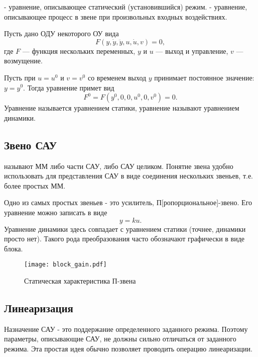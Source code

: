 \documentclass[TAU.tex]{subfiles}
\begin{document}
 - уравнение, описывающее статический (установившийся) режим.
 - уравнение, описывающее процесс в звене при произвольных входных воздействиях.

Пусть дано ОДУ некоторого ОУ вида
\begin{equation}\label{EQ_DYNAMIC}
F(y,\dot y, \ddot y, u, \dot u, v) = 0,
\end{equation}
где $F$ --- функция нескольких переменных, $y$ и $u$ --- выход и управление, $v$ --- возмущение.

Пусть при $u=u^0$ и $v=v^0$ со временем выход $y$ принимает постоянное значение: $y=y^0$. Тогда уравнение  примет вид
\begin{equation}\label{EQ_STATIC}
F^0=F(y^0, 0, 0, u^0, 0, v^0) = 0.
\end{equation}
Уравнение  называется уравнением статики, уравнение  называют уравнением динамики.

\subsection{Звено САУ} %

 называют ММ либо части САУ, либо САУ целиком. Понятие звена удобно использовать для представления САУ в виде соединения нескольких звеньев, т.е. более простых ММ.

Одно из самых простых звеньев - это усилитель, П[ропорциональное]-звено. Его уравнение можно записать в виде
$$
y = ku.
$$
Уравнение динамики здесь совпадает с уравнением статики (точнее, динамики просто нет). Такого рода преобразования часто обозначают графически в виде блока.


\begin{figure}[h]
\centering
\texttt{[image: block\_gain.pdf]}
\caption{Статическая характеристика П-звена}
\centering
\end{figure}



\subsection{Линеаризация} %

Назначение САУ - это поддержание определенного заданного режима. Поэтому параметры, описывающие САУ, не должны сильно отличаться от заданного режима. Эта простая идея обычно позволяет проводить операцию линеаризации.
\end{document}
